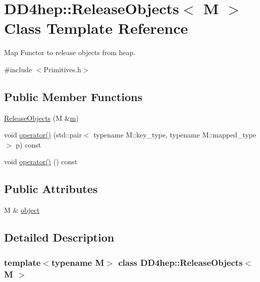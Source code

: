 \hypertarget{class_d_d4hep_1_1_release_objects}{}\section{D\+D4hep\+:\+:Release\+Objects$<$ M $>$ Class Template Reference}
\label{class_d_d4hep_1_1_release_objects}


Map Functor to release objects from heap.  




{\ttfamily \#include $<$Primitives.\+h$>$}

\subsection*{Public Member Functions}
\begin{DoxyCompactItemize}
\item 
\hyperlink{class_d_d4hep_1_1_release_objects_ac8bed15483a32f35c3a157ff1a906080}{Release\+Objects} (M \&\hyperlink{_volumes_8cpp_a6fc379aaec47ce424b00d8ffda2a6c59}{m})
\item 
void \hyperlink{class_d_d4hep_1_1_release_objects_a76c10066e6dfdb228c341c6784a3bc0b}{operator()} (std\+::pair$<$ typename M\+::key\+\_\+type, typename M\+::mapped\+\_\+type $>$ p) const
\item 
void \hyperlink{class_d_d4hep_1_1_release_objects_a24ddec81dde41af9dba6fda88b9c0554}{operator()} () const
\end{DoxyCompactItemize}
\subsection*{Public Attributes}
\begin{DoxyCompactItemize}
\item 
M \& \hyperlink{class_d_d4hep_1_1_release_objects_a7f09cfa8646e892394904c47bb1faf98}{object}
\end{DoxyCompactItemize}


\subsection{Detailed Description}
\subsubsection*{template$<$typename M$>$\newline
class D\+D4hep\+::\+Release\+Objects$<$ M $>$}

